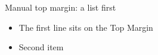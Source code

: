 \SMManualTopMargin
\begin{standardframe}{Manual top margin: a list first}
	\begin{itemize}
		\item The first line sits on the Top Margin
		\item Second item
	\end{itemize}
\end{standardframe}
